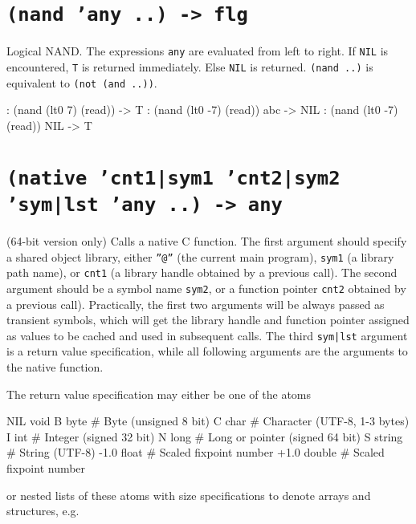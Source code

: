  
\section*{\texttt{(nand 'any ..) -> flg}}
\label{sec:func-ref-N-(nand 'any ..) -> flg}


Logical NAND. The expressions \texttt{any} are evaluated from left to right. If
\texttt{NIL} is encountered, \texttt{T} is returned immediately. Else \texttt{NIL} is
returned. \texttt{(nand ..)} is equivalent to \texttt{(not (and ..))}.


\begin{wideverbatim}
: (nand (lt0 7) (read))
-> T
: (nand (lt0 -7) (read))
abc
-> NIL
: (nand (lt0 -7) (read))
NIL
-> T
\end{wideverbatim}

 
\section*{\texttt{(native 'cnt1|sym1 'cnt2|sym2 'sym|lst 'any ..) -> any}}
\label{sec:func-ref-N-(native 'cnt1|sym1 'cnt2|sym2 'sym|lst 'any ..) -> any}


(64-bit version only) Calls a native C function. The first argument
should specify a shared object library, either \texttt{''@''} (the current main
program), \texttt{sym1} (a library path name), or \texttt{cnt1} (a library handle
obtained by a previous call). The second argument should be a symbol
name \texttt{sym2}, or a function pointer \texttt{cnt2} obtained by a previous call).
Practically, the first two arguments will be always passed as transient
symbols, which will get the library handle and function pointer assigned
as values to be cached and used in subsequent calls. The third \texttt{sym|lst}
argument is a return value specification, while all following arguments
are the arguments to the native function.

The return value specification may either be one of the atoms


\begin{wideverbatim}
 NIL   void
 B     byte     # Byte (unsigned 8 bit)
 C     char     # Character (UTF-8, 1-3 bytes)
 I     int      # Integer (signed 32 bit)
 N     long     # Long or pointer (signed 64 bit)
 S     string   # String (UTF-8)
-1.0   float    # Scaled fixpoint number
+1.0   double   # Scaled fixpoint number
\end{wideverbatim}

or nested lists of these atoms with size specifications to denote arrays
and structures, e.g.


